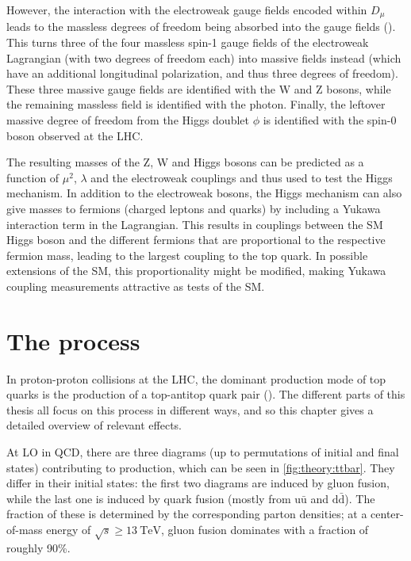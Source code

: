 However, the interaction with the electroweak gauge fields encoded within $D_\mu$ leads to the massless degrees of freedom being absorbed into the gauge fields (). This turns three of the four massless spin-1 gauge fields of the electroweak Lagrangian (with two degrees of freedom each) into massive fields instead (which have an additional longitudinal polarization, and thus three degrees of freedom). These three massive gauge fields are identified with the W and Z bosons, while the remaining massless field is identified with the photon. Finally, the leftover massive degree of freedom from the Higgs doublet $\phi$ is identified with the spin-0 boson observed at the LHC.

The resulting masses of the Z, W and Higgs bosons can be predicted as a function of $\mu^2$, $\lambda$ and the electroweak couplings and thus used to test the Higgs mechanism. In addition to the electroweak bosons, the Higgs mechanism can also give masses to fermions (charged leptons and quarks) by including a Yukawa interaction term in the Lagrangian. This results in couplings between the SM Higgs boson and the different fermions that are proportional to the respective fermion mass, leading to the largest coupling to the top quark. In possible extensions of the SM, this proportionality might be modified, making Yukawa coupling measurements attractive as tests of the SM.

\section{The \texorpdfstring{\pptt}{pp -> tt} process}
\label{sec:theory:ttbar}

In proton-proton collisions at the LHC, the dominant production mode of top quarks is the production of a top-antitop quark pair (\ttbar). The different parts of this thesis all focus on this process in different ways, and so this chapter gives a detailed overview of relevant effects.

At LO in QCD, there are three diagrams (up to permutations of initial and final states) contributing to \ttbar production, which can be seen in \cref{fig:theory:ttbar}. They differ in their initial states: the first two diagrams are induced by gluon fusion, while the last one is induced by quark fusion (mostly from $\mathrm{u \bar{u}}$ and $\mathrm{d \bar{d}}$). The fraction of these is determined by the corresponding parton densities; at a center-of-mass energy of $\sqrt{s} \geq \SI{13}{\TeV}$, gluon fusion dominates with a fraction of roughly 90\%.

